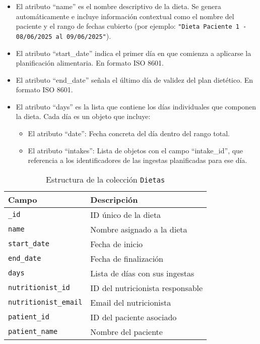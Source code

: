 \begin{itemize}
    \item El atributo ``name'' es el nombre descriptivo de la dieta. Se genera automáticamente e incluye información contextual como el nombre del paciente y el rango de fechas cubierto (por ejemplo: \texttt{"Dieta Paciente 1 - 08/06/2025 al 09/06/2025"}).
    
    \item El atributo ``start\_date'' indica el primer día en que comienza a aplicarse la planificación alimentaria. En formato ISO 8601.
    
    \item El atributo ``end\_date'' señala el último día de validez del plan dietético. En formato ISO 8601.
    
    \item El atributo ``days'' es la lista que contiene los días individuales que componen la dieta. Cada día es un objeto que incluye:
    \begin{itemize}
        \item El atributo ``date'': Fecha concreta del día dentro del rango total.
        \item El atributo ``intakes'': Lista de objetos con el campo ``intake\_id'', que referencia a los identificadores de las ingestas planificadas para ese día.
    \end{itemize}    
\end{itemize}

\begin{table}[H]
    \centering
    \begin{tabular}{|l|p{8cm}|}
        \hline
        \textbf{Campo} & \textbf{Descripción} \\
        \hline
        \texttt{\_id} & ID único de la dieta \\
        \hline
        \texttt{name} & Nombre asignado a la dieta \\
        \hline
        \texttt{start\_date} & Fecha de inicio \\
        \hline
        \texttt{end\_date} & Fecha de finalización \\
        \hline
        \texttt{days} & Lista de días con sus ingestas \\
        \hline
        \texttt{nutritionist\_id} & ID del nutricionista responsable \\
        \hline
        \texttt{nutritionist\_email} & Email del nutricionista \\
        \hline
        \texttt{patient\_id} & ID del paciente asociado \\
        \hline
        \texttt{patient\_name} & Nombre del paciente \\
        \hline
    \end{tabular}
    \caption{Estructura de la colección \texttt{Dietas}}
    \label{tab:dietas}
\end{table}

